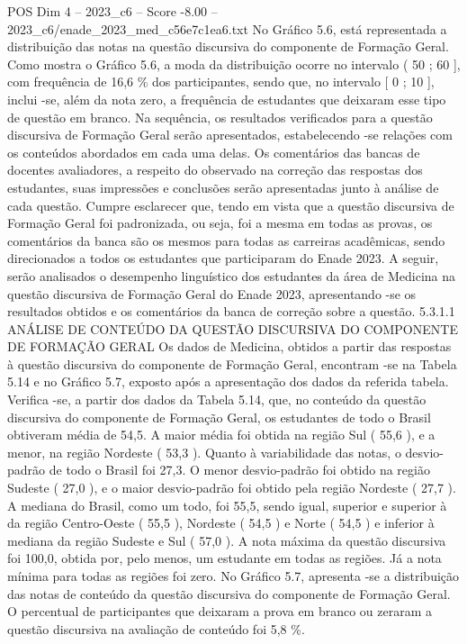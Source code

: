 \begin{textsample}{POS Dim 4 – 2023\_c6 – Score -8.00 – 2023\_c6/enade\_2023\_med\_c56e7c1ea6.txt}
No Gráfico 5.6, está representada a distribuição das notas na questão discursiva do componente de Formação Geral.
Como mostra o Gráfico 5.6, a moda da distribuição ocorre no intervalo ( 50 ; 60 ], com frequência de 16,6 \% dos participantes, sendo que, no intervalo [ 0 ; 10 ], inclui -se, além da nota zero, a frequência de estudantes que deixaram esse tipo de questão em branco.
Na sequência, os resultados verificados para a questão discursiva de Formação Geral serão apresentados, estabelecendo -se relações com os conteúdos abordados em cada uma delas.
Os comentários das bancas de docentes avaliadores, a respeito do observado na correção das respostas dos estudantes, suas impressões e conclusões serão apresentadas junto à análise de cada questão.
Cumpre esclarecer que, tendo em vista que a questão discursiva de Formação Geral foi padronizada, ou seja, foi a mesma em todas as provas, os comentários da banca são os mesmos para todas as carreiras acadêmicas, sendo direcionados a todos os estudantes que participaram do Enade 2023.
A seguir, serão analisados o desempenho linguístico dos estudantes da área de Medicina na questão discursiva de Formação Geral do Enade 2023, apresentando -se os resultados obtidos e os comentários da banca de correção sobre a questão. 5.3.1.1 ANÁLISE DE CONTEÚDO DA QUESTÃO DISCURSIVA DO COMPONENTE DE FORMAÇÃO GERAL Os dados de Medicina, obtidos a partir das respostas à questão discursiva do componente de Formação Geral, encontram -se na Tabela 5.14 e no Gráfico 5.7, exposto após a apresentação dos dados da referida tabela.
Verifica -se, a partir dos dados da Tabela 5.14, que, no conteúdo da questão discursiva do componente de Formação Geral, os estudantes de todo o Brasil obtiveram média de 54,5.
A maior média foi obtida na região Sul ( 55,6 ), e a menor, na região Nordeste ( 53,3 ).
Quanto à variabilidade das notas, o desvio-padrão de todo o Brasil foi 27,3.
O menor desvio-padrão foi obtido na região Sudeste ( 27,0 ), e o maior desvio-padrão foi obtido pela região Nordeste ( 27,7 ).
A mediana do Brasil, como um todo, foi 55,5, sendo igual, superior e superior à da região Centro-Oeste ( 55,5 ), Nordeste ( 54,5 ) e Norte ( 54,5 ) e inferior à mediana da região Sudeste e Sul ( 57,0 ).
A nota máxima da questão discursiva foi 100,0, obtida por, pelo menos, um estudante em todas as regiões.
Já a nota mínima para todas as regiões foi zero.
No Gráfico 5.7, apresenta -se a distribuição das notas de conteúdo da questão discursiva do componente de Formação Geral.
O percentual de participantes que deixaram a prova em branco ou zeraram a questão discursiva na avaliação de conteúdo foi 5,8 \%.

\end{textsample}
